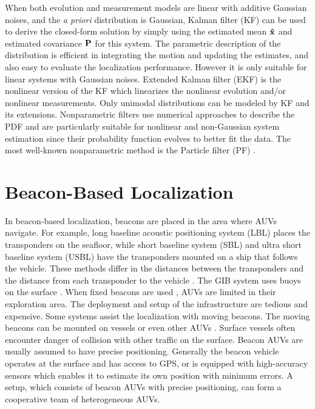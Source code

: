 When both evolution and measurement models are linear with additive Gaussian noises, and the \textit{a priori} distribution is Gaussian, Kalman filter (KF) \cite{welch1995} can be used to derive the closed-form solution by simply using the estimated mean ${\bf\hat x}$ and estimated covariance ${\bf P}$ for this system. The parametric description of the distribution is efficient in integrating the motion and updating the estimates, and also easy to evaluate the localization performance. However it is only suitable for linear systems with Gaussian noises. Extended Kalman filter (EKF) \cite{Julier2004} is the nonlinear version of the KF which linearizes the nonlinear evolution and/or nonlinear measurements. Only unimodal distributions can be modeled by KF and its extensions. Nonparametric filters use numerical approaches to describe the PDF and are particularly suitable for nonlinear and non-Gaussian system estimation since their probability function evolves to better fit the data. The most well-known nonparametric method is the Particle filter (PF) \cite{PFtutorial}.

\section{Beacon-Based Localization}

In beacon-based localization, beacons are placed in the area where AUVs navigate. For example, long baseline acoustic positioning system (LBL) places the transponders on the seafloor, while short baseline system (SBL) and ultra short baseline system (USBL) have the transponders mounted on a ship that follows the vehicle. These methods differ in the distances between the transponders and the distance from each transponder to the vehicle \cite{Wolbrecht2014}. The GIB system uses buoys on the surface \cite{Alcocer2006}. When fixed beacons are used \cite{AlexPhillips2018B}, AUVs are limited in their exploration area. The deployment and setup of the infrastructure are tedious and expensive. Some systems assist the localization with moving beacons. The moving beacons can be mounted on vessels \cite{Curcio2005, Webster2013,AlexPhillips2018} or even other AUVs \cite{Baccou2001,Deshpande2007,Gao2010}. Surface vessels often encounter danger of collision with other traffic on the surface.
Beacon AUVs are usually assumed to have precise positioning. Generally the beacon vehicle operates at the surface and has access to GPS, or is equipped with high-accuracy sensors which enables it to estimate its own position with minimum errors. A setup, which consists of beacon AUVs with precise positioning, can form a cooperative team of heterogeneous AUVs. 

